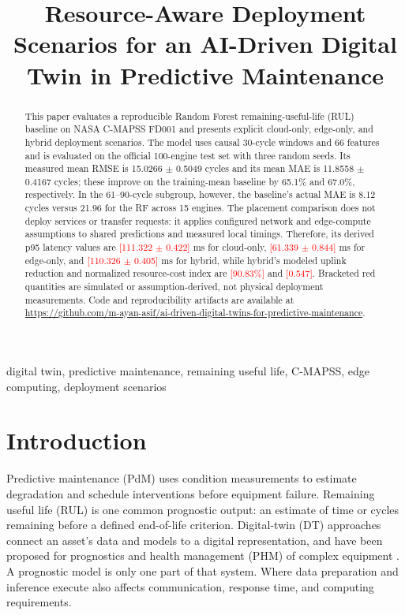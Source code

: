 ﻿\documentclass[conference]{IEEEtran}
\newcommand{\simval}[1]{\textcolor{red}{[#1]}}
\begin{document}
\title{Resource-Aware Deployment Scenarios for an AI-Driven Digital Twin in Predictive Maintenance}

\author{
}

\maketitle

\begin{abstract}
This paper evaluates a reproducible Random Forest remaining-useful-life (RUL) baseline on NASA C-MAPSS FD001 and presents explicit cloud-only, edge-only, and hybrid deployment scenarios. The model uses causal 30-cycle windows and 66 features and is evaluated on the official 100-engine test set with three random seeds. Its measured mean RMSE is 15.0266 $\pm$ 0.5049 cycles and its mean MAE is 11.8558 $\pm$ 0.4167 cycles; these improve on the training-mean baseline by 65.1\% and 67.0\%, respectively. In the 61--90-cycle subgroup, however, the baseline's actual MAE is 8.12 cycles versus 21.96 for the RF across 15 engines. The placement comparison does not deploy services or transfer requests: it applies configured network and edge-compute assumptions to shared predictions and measured local timings. Therefore, its derived p95 latency values are \simval{111.322 $\pm$ 0.422} ms for cloud-only, \simval{61.339 $\pm$ 0.844} ms for edge-only, and \simval{110.326 $\pm$ 0.405} ms for hybrid, while hybrid's modeled uplink reduction and normalized resource-cost index are \simval{90.83\%} and \simval{0.547}. Bracketed red quantities are simulated or assumption-derived, not physical deployment measurements. Code and reproducibility artifacts are available at \url{https://github.com/m-ayan-asif/ai-driven-digital-twins-for-predictive-maintenance}.
\end{abstract}

\begin{IEEEkeywords}
digital twin, predictive maintenance, remaining useful life, C-MAPSS, edge computing, deployment scenarios
\end{IEEEkeywords}

\section{Introduction}
Predictive maintenance (PdM) uses condition measurements to estimate degradation and schedule interventions before equipment failure. Remaining useful life (RUL) is one common prognostic output: an estimate of time or cycles remaining before a defined end-of-life criterion. Digital-twin (DT) approaches connect an asset's data and models to a digital representation, and have been proposed for prognostics and health management (PHM) of complex equipment \cite{tao2018,toothman2023}. A prognostic model is only one part of that system. Where data preparation and inference execute also affects communication, response time, and computing requirements.
\end{document}
